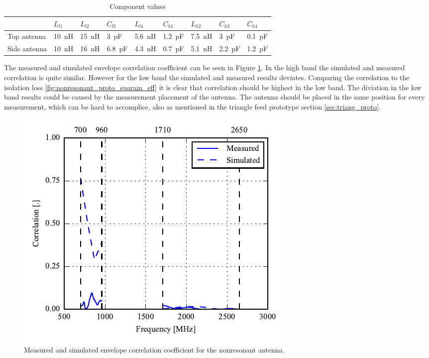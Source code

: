 \begin{table}
  \centering
        \begin{tabular}{|l|l|l|l|l|l|l|l|l|}
            \hline
                         & $L_{l1}$       & $L_{l2}$        & $C_{l3}$      & $L_{l4}$       & $C_{h1}$       & $L_{h2}$      & $C_{h3}$      & $C_{h4}$    \\
            \hline
            Top antenna  & \SI{10}{nH}  & \SI{15}{nH}  & \SI{3}{pF} & \SI{5.6}{nH} & \SI{1.2}{pF} & \SI{7.5}{nH} & \SI{3}{pF} & \SI{0.1}{pF} \\
            Side antenna & \SI{10}{nH}  & \SI{16}{nH}  & \SI{6.8}{pF} & \SI{4.3}{nH} & \SI{0.7}{pF} & \SI{5.1}{nH} & \SI{2.2}{pF} & \SI{1.2}{pF} \\
            \hline
        \end{tabular}
        \caption{Component values}
        \label{fig:ant3schematic_proto}
\end{table}

The measured and simulated envelope correlation coefficient can be seen in Figure \ref{fig:nonresonant_proto_ecc}. In the high band the simulated and measured correlation is quite similar. However for the low band the simulated and measured results deviates. Comparing the correlation to the isolation loss \ref{fig:nonresonant_proto_sparam_eff} it is clear that correlation should be highest in the low band. The diviation in the low band results could be caused by the measurement placement of the antenna. The antenna should be placed in the same position for every measurement, which can be hard to accomplice, also as mentioned in the triangle feed prototype section \ref{sec:triang_proto}.   

\begin{figure}[htbp]
    \centering
    \includegraphics{img/tech_sol/nonresonant/prototype/correlation.pdf}
    \caption{Measured and simulated envelope correlation coefficient for the nonresonant antenna.}
    \label{fig:nonresonant_proto_ecc}
\end{figure}

